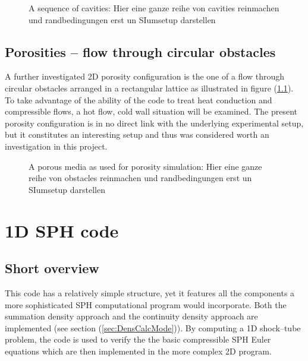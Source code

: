 \documentclass{report}
\begin{document}
\begin{figure}[!htbp]
  \centering
  \caption{A sequence of cavities: Hier eine ganze reihe von cavities reinmachen und randbedingungen erst un SIumsetup darstellen }
  \label{fig:PorositiesSequenceOfCavities}
\end{figure}


\subsection{Porosities -- flow through circular obstacles}
\label{sec:PorositiesCircularObstacles}
A further investigated 2D porosity configuration is the one of a flow through circular obstacles arranged in a rectangular lattice as illustrated in figure (\ref{}). To take advantage of the ability of the code to treat heat conduction and compressible flows, a hot flow, cold wall situation will be examined. The present porosity configuration is in no direct link with the underlying experimental setup, but it constitutes an interesting setup and thus was considered worth an investigation in this project. 

\begin{figure}[!htbp]
  \centering
  \caption{A porous media as used for porosity simulation: Hier eine ganze reihe von obstacles reinmachen und randbedingungen erst un SIumsetup darstellen }
  \label{fig:PorositiesCircularObstacles}
\end{figure}



\section{1D SPH code}
\label{sec:1DSPHcode}

\subsection{Short overview}

This code has a relatively simple structure, yet it features all the components
a more sophisticated SPH computational program would incorporate. Both the summation 
density approach and the continuity density approach are implemented (see section (\ref{sec:DensCalcMode})). By computing a 1D shock--tube problem, the code is used to verify the the basic compressible SPH Euler equations which are then implemented in the more complex 2D program.
 
\end{document}
